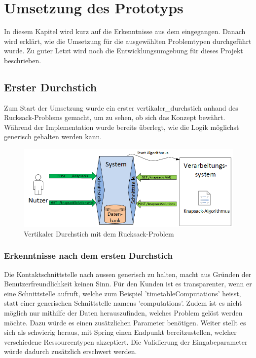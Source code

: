 %
%

\chapter{Umsetzung des Prototyps \resultAssignment{[R5]}}\label{chap.umsetzung}
In diesem Kapitel wird kurz auf die Erkenntnisse aus dem  eingegangen. Danach wird erklärt, wie die Umsetzung für die ausgewählten 
Problemtypen durchgeführt wurde. Zu guter Letzt wird noch die Entwicklungsumgebung für dieses Projekt beschrieben.

\section{Erster Durchstich}\label{entwicklungsumgebung}
Zum Start der Umsetzung wurde ein erster \gls{vertikaler_durchstich} anhand des Rucksack-Problems gemacht, um zu sehen, ob sich das Konzept bewährt. Während der 
Implementation wurde bereits überlegt, wie die Logik möglichst generisch gehalten werden kann.

\begin{figure}[h]
\centering
\includegraphics[scale=0.74]{images/visio/prototype_knapsack.png}
\caption[\Gls{vertikaler_durchstich} mit dem Rucksack-Problem]{Vertikaler Durchstich mit dem Rucksack-Problem \selfmade{}}
\label{fig:prototyp_knapsack}
\end{figure}

\subsection{Erkenntnisse nach dem ersten Durchstich}\label{learning_prototyp}
Die Kontaktschnittstelle nach aussen generisch zu halten, macht aus Gründen der Benutzerfreundlichkeit keinen Sinn. Für den Kunden ist es transparenter, wenn er eine Schnittstelle aufruft, 
welche zum Beispiel 'timetableComputations' heisst, statt einer generischen Schnittstelle namens 'computations'. Zudem ist es nicht möglich nur mithilfe der Daten herauszufinden, welches 
Problem gelöst werden möchte. Dazu würde es einen zusätzlichen Parameter benötigen. Weiter stellt es sich als schwierig heraus, mit Spring einen Endpunkt bereitzustellen, welcher 
verschiedene Ressourcentypen akzeptiert. Die Validierung der Eingabeparameter würde dadurch zusätzlich erschwert werden.

